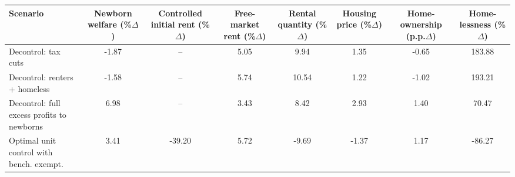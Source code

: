 \footnotesize
\renewcommand{\arraystretch}{1.2}
\begin{center}
\begin{tabular}{lccccccc}
\toprule
\textbf{Scenario} 
& \shortstack{\textbf{Newborn} \\ \textbf{welfare} \\ (\%$\Delta$)}
& \shortstack{\textbf{Controlled} \\ \textbf{initial rent} \\ (\%$\Delta$)}
& \shortstack{\textbf{Free-} \\\textbf{market} \\ \textbf{rent} \\ (\%$\Delta$)}
& \shortstack{\textbf{Rental} \\ \textbf{quantity} \\ (\%$\Delta$)}
& \shortstack{\textbf{Housing} \\ \textbf{price} \\ (\%$\Delta$)}
& \shortstack{\textbf{Home-} \\ \textbf{ownership} \\ (p.p.$\Delta$)}
& \shortstack{\textbf{Home-} \\ \textbf{lessness} \\ (\%$\Delta$)} \\
\midrule
Decontrol: tax cuts & -1.87 & -- & 5.05 & 9.94 & 1.35 & -0.65 & 183.88 \\
Decontrol: renters + homeless & -1.58 & -- & 5.74 & 10.54 & 1.22 & -1.02 & 193.21 \\
Decontrol: full excess profits to newborns & 6.98 & -- & 3.43 & 8.42 & 2.93 & 1.40 & 70.47 \\
Optimal unit control with bench. exempt. & 3.41 & -39.20 & 5.72 & -9.69 & -1.37 & 1.17 & -86.27 \\
\bottomrule
\end{tabular}
\end{center}
\normalsize
